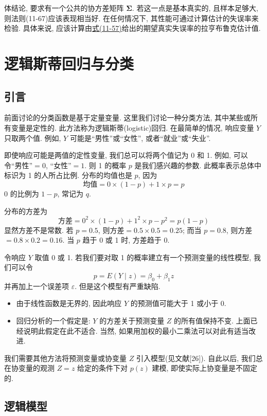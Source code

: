 
体结论, 要求有一个公共的协方差矩阵 $\boldsymbol{\Sigma}$. 若这一点是基本真实的, 且样本足够大, 则法则(11-67)应该表现相当好. 在任何情况下, 其性能可通过计算估计的失误率来检验. 具体来说, 应该计算由\hyperref[eq:11-57]{式(11-57)}给出的期望真实失误率的拉亨布鲁克估计值.

\section{逻辑斯蒂回归与分类}
\label{sec:11.8}

\subsection{引言}

前面讨论的分类函数是基于定量变量. 这里我们讨论一种分类方法, 其中某些或所有变量是定性的. 此方法称为逻辑斯蒂(logistic)回归. 在最简单的情况, 响应变量 $Y$ 只取两个值. 例如, $Y$ 可能是“男性”或“女性”, 或者“就业”或“失业”.

即使响应可能是两值的定性变量, 我们总可以将两个值记为 0 和 1. 例如, 可以令“男性”$=0$, “女性”$=1$. 则 1 的概率 $p$ 是我们感兴趣的参数. 此概率表示总体中标识为 1 的人所占比例. 分布的均值也是 $p$, 因为
\[
\text{均值}=0\times(1-p)+1\times p=p
\]
0 的比例为 $1-p$, 常记为 $q$.

分布的方差为
\[
\text{方差}=0^2\times(1-p)+1^2\times p-p^2=p(1-p)
\]
显然方差不是常数. 若 $p=0.5$, 则方差$=0.5\times 0.5=0.25$; 而当 $p=0.8$, 则方差$=0.8\times 0.2=0.16$. 当 $p$ 趋于 0 或 1 时, 方差趋于 0.

令响应 $Y$ 取值 0 或 1. 若我们要对取 1 的概率建立有一个预测变量的线性模型, 我们可以令
\[
p=E(Y\mid z)=\beta_0+\beta_1 z
\]
并再加上一个误差项 $\varepsilon$. 但是这个模型有严重缺陷.

\begin{itemize}
\item 由于线性函数是无界的, 因此响应 $Y$ 的预测值可能大于 1 或小于 0.
\item 回归分析的一个假定是: $Y$ 的方差关于预测变量 $Z$ 的所有值保持不变. 上面已经说明此假定在此不适合. 当然, 如果用加权的最小二乘法可以对此有适当改进.
\end{itemize}

我们需要其他方法将预测变量或协变量 $Z$ 引入模型(见文献[26]). 自此以后, 我们总在协变量的观测 $Z=z$ 给定的条件下对 $p(z)$ 建模, 即使实际上协变量是不固定的.

\subsection{逻辑模型}

